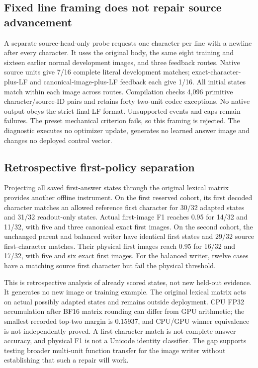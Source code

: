 \subsection*{Fixed line framing does not repair source advancement}
A separate source-head-only probe requests one character per line with a
newline after every character. It uses the original body, the same eight
training and sixteen earlier normal development images, and three feedback
routes. Native source units give 7/16 complete literal development matches;
exact-character-plus-LF and canonical-image-plus-LF feedback each give 1/16.
All initial states match within each image across routes. Compilation checks
4,096 primitive character/source-ID pairs and retains forty two-unit codec
exceptions. No native output obeys the strict final-LF format. Unsupported
events and caps remain failures. The preset mechanical criterion fails, so
this framing is rejected. The diagnostic executes no optimizer update,
generates no learned answer image and changes no deployed control vector.

\subsection*{Retrospective first-policy separation}
Projecting all saved first-answer states through the original lexical matrix
provides another offline instrument. On the first reserved cohort, its first
decoded character matches an allowed reference first character for 30/32
adapted states and 31/32 readout-only states. Actual first-image F1 reaches
0.95 for 14/32 and 11/32, with five and three canonical exact first images.
On the second cohort, the unchanged parent and balanced writer have identical
first states and 29/32 source first-character matches. Their physical first
images reach 0.95 for 16/32 and 17/32, with five and six exact first images.
For the balanced writer, twelve cases have a matching source first character
but fail the physical threshold.

This is retrospective analysis of already scored states, not new held-out
evidence. It generates no new image or training example. The original lexical
matrix acts on actual possibly adapted states and remains outside deployment.
CPU FP32 accumulation after BF16 matrix rounding can differ from GPU arithmetic;
the smallest recorded top-two margin is 0.15937, and CPU/GPU winner equivalence
is not independently proved. A first-character match is not complete-answer
accuracy, and physical F1 is not a Unicode identity classifier. The gap supports
testing broader multi-unit function transfer for the image writer without
establishing that such a repair will work.

